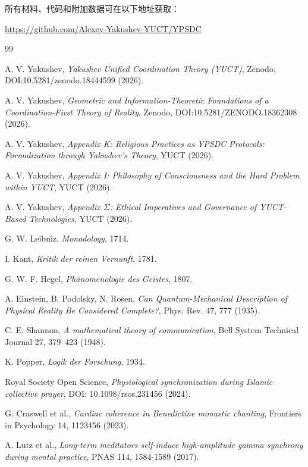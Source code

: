 \documentclass[11pt,a4paper]{article}
\begin{document}
	所有材料、代码和附加数据可在以下地址获取：
	\begin{center}
		\url{https://github.com/Alexey-Yakushev-YUCT/YPSDC}
	\end{center}
	
	\begin{thebibliography}{99}
		
		A. V. Yakushev, \emph{Yakushev Unified Coordination Theory (YUCT)}, Zenodo, DOI:10.5281/zenodo.18444599 (2026).
		
		A. V. Yakushev, \emph{Geometric and Information-Theoretic Foundations of a Coordination-First Theory of Reality}, Zenodo, DOI:10.5281/ZENODO.18362308 (2026).
		
		A. V. Yakushev, \emph{Appendix K: Religious Practices as YPSDC Protocols: Formalization through Yakushev's Theory}, YUCT (2026).
		
		A. V. Yakushev, \emph{Appendix I: Philosophy of Consciousness and the Hard Problem within YUCT}, YUCT (2026).
		
		A. V. Yakushev, \emph{Appendix \(\Sigma\): Ethical Imperatives and Governance of YUCT-Based Technologies}, YUCT (2026).
		
		G. W. Leibniz, \emph{Monadology}, 1714.
		
		I. Kant, \emph{Kritik der reinen Vernunft}, 1781.
		
		G. W. F. Hegel, \emph{Phänomenologie des Geistes}, 1807.
		
		A. Einstein, B. Podolsky, N. Rosen, \emph{Can Quantum-Mechanical Description of Physical Reality Be Considered Complete?}, Phys. Rev. 47, 777 (1935).
		
		C. E. Shannon, \emph{A mathematical theory of communication}, Bell System Technical Journal 27, 379--423 (1948).
		
		K. Popper, \emph{Logik der Forschung}, 1934.
		
		Royal Society Open Science, \emph{Physiological synchronization during Islamic collective prayer}, DOI: 10.1098/rsos.231456 (2024).
		
		G. Craswell et al., \emph{Cardiac coherence in Benedictine monastic chanting}, Frontiers in Psychology 14, 1123456 (2023).
		
		A. Lutz et al., \emph{Long-term meditators self-induce high-amplitude gamma synchrony during mental practice}, PNAS 114, 1584-1589 (2017).
		

\end{thebibliography}
\end{document}

